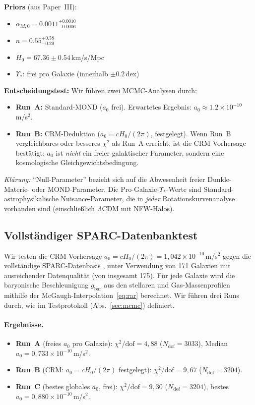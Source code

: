 \documentclass[aps,prd,twocolumn,superscriptaddress,nofootinbib]{revtex4-2}
\begin{document}
\textbf{Priors} (aus Paper~III):
\begin{itemize}
\item $\alpha_{M,0} = 0.0011^{+0.0010}_{-0.0006}$
\item $n = 0.55^{+0.58}_{-0.29}$
\item $H_0 = 67.36 \pm 0.54$\,km/s/Mpc
\item $\Upsilon_*$: frei pro Galaxie (innerhalb $\pm 0.2$\,dex)
\end{itemize}

\textbf{Entscheidungstest:} Wir f\"uhren zwei MCMC-Analysen durch:
\begin{itemize}
\item \textbf{Run~A:} Standard-MOND ($a_0$ frei). Erwartetes Ergebnis: $a_0 \approx 1.2 \times 10^{-10}$\,m/s$^2$.
\item \textbf{Run~B:} CRM-Deduktion ($a_0 = cH_0/(2\pi)$, festgelegt). Wenn Run~B vergleichbares oder besseres $\chi^2$ als Run~A erreicht, ist die CRM-Vorhersage best\"atigt: $a_0$ ist \textit{nicht} ein freier galaktischer Parameter, sondern eine kosmologische Gleichgewichtsbedingung.
\end{itemize}

\textit{Kl\"arung:} ``Null-Parameter'' bezieht sich auf die Abwesenheit freier Dunkle-Materie- oder MOND-Parameter. Die Pro-Galaxie-$\Upsilon_*$-Werte sind Standard-astrophysikalische Nuisance-Parameter, die in \textit{jeder} Rotationskurvenanalyse vorhanden sind (einschlie\ss{}lich $\Lambda$CDM mit NFW-Halos).

\subsection{Vollst\"andiger SPARC-Datenbanktest}
\label{sec:sparc_results}

Wir testen die CRM-Vorhersage $a_0 = cH_0/(2\pi) = 1{,}042 \times 10^{-10}$\,m/s$^2$ gegen die vollst\"andige SPARC-Datenbasis \cite{Lelli2016}, unter Verwendung von 171 Galaxien mit ausreichender Datenqualit\"at (von insgesamt 175). F\"ur jede Galaxie wird die baryonische Beschleunigung $g_{\mathrm{bar}}$ aus den stellaren und Gas-Massenprofilen mithilfe der McGaugh-Interpolation~\eqref{eq:rar} berechnet. Wir f\"uhren drei Runs durch, wie im Testprotokoll (Abs.~\ref{sec:mcmc}) definiert.

\paragraph{Ergebnisse.}
\begin{itemize}
\item \textbf{Run~A} (freies $a_0$ pro Galaxie): $\chi^2/\mathrm{dof} = 4{,}88$ ($N_{\mathrm{dof}} = 3033$), Median $a_0 = 0{,}733 \times 10^{-10}$\,m/s$^2$.
\item \textbf{Run~B} (CRM: $a_0 = cH_0/(2\pi)$ festgelegt): $\chi^2/\mathrm{dof} = 9{,}67$ ($N_{\mathrm{dof}} = 3204$).
\item \textbf{Run~C} (bestes globales $a_0$, frei): $\chi^2/\mathrm{dof} = 9{,}30$ ($N_{\mathrm{dof}} = 3204$), bestes $a_0 = 0{,}880 \times 10^{-10}$\,m/s$^2$.
\end{itemize}
\end{document}
